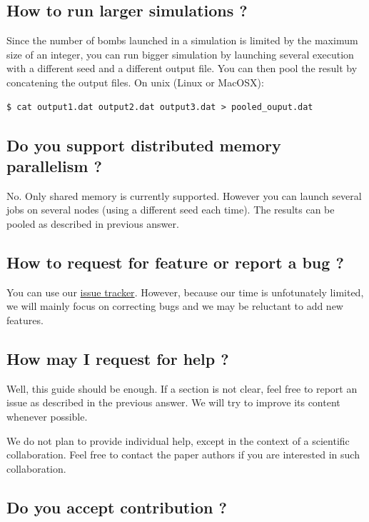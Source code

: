 \documentclass[10pt,a4paper]{article}
\begin{document}
\subsection{How to run larger simulations ?}
\label{sec-6-5}

Since the number of bombs launched in a simulation is limited by the maximum
size of an integer, you can run bigger simulation by launching several
execution with a different seed and a different output file. You can then 
pool the result by concatening the output files. On unix (Linux or MacOSX):

\begin{verbatim}
$ cat output1.dat output2.dat output3.dat > pooled_ouput.dat
\end{verbatim}

\subsection{Do you support distributed memory parallelism ?}
\label{sec-6-6}

No. Only shared memory is currently supported. However you can launch 
several jobs on several nodes (using a different seed each time). The results
can be pooled as described in previous answer.

\subsection{How to request for feature or report a bug ?}
\label{sec-6-7}

You can use our \href{https://github.com/unigeSPC/gbf/issues}{issue
  tracker}. However, because our time is unfotunately limited, we will
mainly focus on correcting bugs and we may be reluctant to add new
features.

\subsection{How may I request for help ?}
\label{sec-6-8}

Well, this guide should be enough. If a section is not clear, feel free to
report an issue as described in the previous answer. We will try to
improve its content whenever possible.

We do not plan to provide individual help, except in the context of a
scientific collaboration. Feel free to contact the paper authors if
you are interested in such collaboration.

\subsection{Do you accept contribution ?}
\label{sec-6-9}
\end{document}
